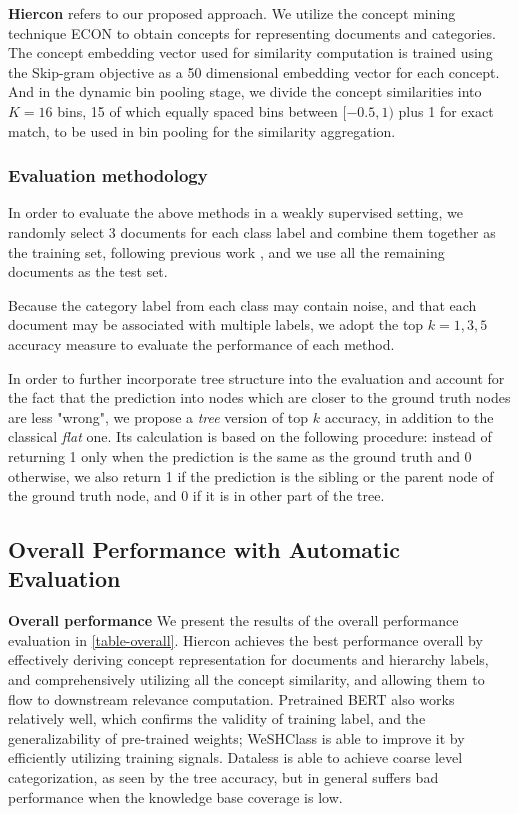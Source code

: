 \noindent \textbf{Hiercon} refers to our proposed approach. %
We utilize the concept mining technique ECON \cite{li2018concept} to obtain concepts for representing documents and categories.
The concept embedding vector used for similarity computation is trained using the Skip-gram objective as a 50 dimensional embedding vector for each concept.
And in the dynamic bin pooling stage, we divide the concept similarities into $K=16$ bins, 15 of which equally spaced bins between $[-0.5,1)$ plus 1 for exact match, to be used in bin pooling for the similarity aggregation.



\subsubsection{Evaluation methodology}
In order to evaluate the above methods in a weakly supervised setting,
we randomly select 3 documents for each class label and combine them together as the training set, 
following previous work \cite{meng2018weakly}, and we use all the remaining documents as the test set.

Because the category label from each class may contain noise, 
and that each document may be associated with multiple labels, we adopt the top $k = 1,3,5$ accuracy measure \cite{lapin2015top} to evaluate the performance of each method.

In order to further incorporate tree structure into the evaluation and account for the fact that the prediction into nodes which are closer to the ground truth nodes are less "wrong", we propose a \textit{tree} version of top $k$ accuracy, in addition to the classical \textit{flat} one. Its calculation is based on the following procedure: instead of returning 1 only when the prediction is the same as the ground truth and 0 otherwise, we also return 1 if the prediction is the sibling or the parent node of the ground truth node, and 0 if it is in other part of the tree.


\subsection{Overall Performance with Automatic Evaluation}
\noindent \textbf{Overall performance}
We present the results of the overall performance evaluation in \autoref{table-overall}. Hiercon achieves the best performance overall by effectively deriving concept representation for documents and hierarchy labels, 
and comprehensively utilizing all the concept similarity,
and allowing them to flow to downstream relevance computation.
Pretrained BERT also works relatively well, which confirms the validity of training label, and the generalizability of pre-trained weights; 
WeSHClass is able to improve it by efficiently utilizing training signals.
Dataless is able to achieve coarse level categorization, as seen 
by the tree accuracy, but in general suffers bad performance when  the knowledge base coverage is low.

